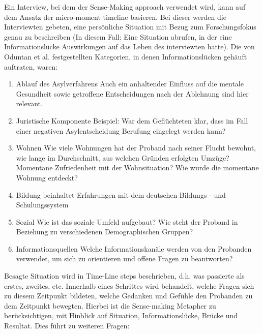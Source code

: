 Ein Interview, bei dem der Sense-Making approach verwendet wird, kann auf dem Ansatz der micro-moment timeline basieren. Bei dieser werden die Interviewten gebeten, eine pers\"onliche Situation mit Bezug zum Forschungsfokus genau zu beschreiben (In diesem Fall: Eine Situation abrufen, in der eine Informationsl\"ucke Auswirkungen auf das Leben des interviewten hatte).
Die von Oduntan et al. festgestellten Kategorien, in denen Informationsl\"ucken geh\"auft auftraten, waren:
\begin{enumerate}
    \item Ablauf des Asylverfahrens\newline
    Auch ein anhaltender Einfluss auf die mentale Gesundheit sowie getroffene Entscheidungen nach der Ablehnung sind hier relevant.
    \item Juristische Komponente \newline
    Beispiel: War dem Gefl\"uchteten klar, dass im Fall einer negativen Asylentscheidung Berufung eingelegt werden kann?
    \item Wohnen \newline
    Wie viele Wohnungen hat der Proband nach seiner Flucht bewohnt, wie lange im Durchschnitt, aus welchen Gr\"unden erfolgten Umz\"uge? Momentane Zufriedenheit mit der Wohnsituation? Wie wurde die momentane Wohnung entdeckt?
    \item Bildung \newline
    beinhaltet Erfahrungen mit dem deutschen Bildungs - und Schulungssystem
    \item Sozial\newline
    Wie ist das soziale Umfeld aufgebaut? Wie steht der Proband in Beziehung zu verschiedenen Demographischen Gruppen?
    \item Informationsquellen\newline
    Welche Informationskan\"ale werden von den Probanden verwendet, um sich zu orientieren und offene Fragen zu beantworten?
\end{enumerate}
Besagte Situation wird in Time-Line steps beschrieben, d.h. was passierte als erstes, zweites, etc. Innerhalb eines Schrittes wird behandelt, welche Fragen sich zu diesem Zeitpunkt bildeten, welche Gedanken und Gef\"uhle den Probanden zu dem Zeitpunkt bewegten.\newline
Hierbei ist die Sense-making Metapher zu ber\"ucksichtigen, mit Hinblick auf Situation, Informationsl\"ucke, Br\"ucke und Resultat.\cite{dervin2003sense}\newline
Dies f\"uhrt zu weiteren Fragen:\newline
